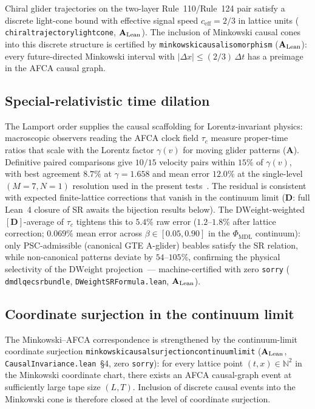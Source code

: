 \documentclass[11pt]{article}
\theoremstyle{remark}
\newcommand{\lean}[1]{%
  \penalty-100
  \begingroup\def\_{\textunderscore\allowbreak}\texttt{#1}\endgroup}
\newcommand{\CatA}{\textbf{A}}
\newcommand{\CatAL}{\ensuremath{\textbf{A}_{\rm Lean}}}
\newcommand{\CatD}{\textbf{D}}
\begin{document}
Chiral glider trajectories on the two-layer Rule~110/Rule~124 pair
satisfy a discrete light-cone bound with effective signal speed
$c_{\mathrm{eff}} = 2/3$ in lattice units
(\lean{chiral\_trajectory\_light\_cone}, \CatAL{}).
The inclusion of Minkowski causal cones into this discrete structure is
certified by \lean{minkowski\_causal\_isomorphism} (\CatAL{}): every
future-directed Minkowski interval with $|\Delta x| \leq (2/3)\,\Delta t$
has a preimage in the AFCA causal graph.

\subsection{Special-relativistic time dilation}
\label{ssec:sr_dilation}

The Lamport order supplies the causal scaffolding for Lorentz-invariant
physics: macroscopic observers reading the AFCA clock field $\tau_c$
measure proper-time ratios that scale with the Lorentz factor
$\gamma(v)$ for moving glider patterns (\CatA{}).
Definitive paired comparisons give $10/15$ velocity pairs within $15\%$
of $\gamma(v)$, with best agreement $8.7\%$ at $\gamma = 1.658$ and mean
error $12.0\%$ at the single-level $(M=7,N=1)$ resolution used in the
present tests~\cite{SpivackEmergentGravity}.
The residual is consistent with expected finite-lattice corrections that
vanish in the continuum limit (\CatD{}: full Lean~4 closure of SR awaits
the bijection results below).
The $\mathrm{DWeight}$-weighted $[\mathbf{D}]$-average of $\tau_c$ tightens this
to $5.4\%$ raw error ($1.2$--$1.8\%$ after lattice correction;
$0.069\%$ mean error across $\beta\in[0.05,0.90]$ in the $\Phi_{\mathrm{MDL}}$
continuum): only PSC-admissible (canonical GTE A-glider) beables satisfy the SR
relation, while non-canonical patterns deviate by $54$--$105\%$, confirming the
physical selectivity of the $\mathrm{DWeight}$ projection~---
machine-certified with zero \texttt{sorry}
(\lean{dmdl\_qec\_sr\_bundle}, \texttt{DWeightSRFormula.lean}, $\CatAL$).

\subsection{Coordinate surjection in the continuum limit}
\label{ssec:minkowski_surj}

The Minkowski--AFCA correspondence is strengthened by the continuum-limit
coordinate surjection
\lean{minkowski\_causal\_surjection\_continuum\_limit}
(\CatAL{}, \texttt{CausalInvariance.lean}~\S4, zero \texttt{sorry}):
for every lattice point $(t,x) \in \mathbb{N}^2$ in the Minkowski
coordinate chart, there exists an AFCA causal-graph event at sufficiently
large tape size $(L,T)$.
Inclusion of discrete causal events into the Minkowski cone is therefore
closed at the level of coordinate surjection.
\end{document}
